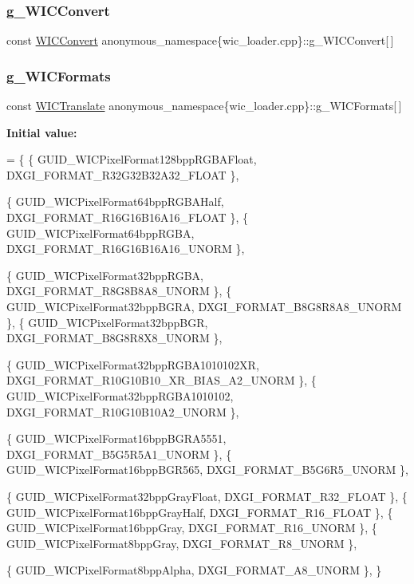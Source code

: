 \subsubsection{\texorpdfstring{g\+\_\+\+W\+I\+C\+Convert}{g\_WICConvert}}
{\footnotesize\ttfamily const \mbox{\hyperlink{structanonymous__namespace_02wic__loader_8cpp_03_1_1_w_i_c_convert}{W\+I\+C\+Convert}} anonymous\+\_\+namespace\{wic\+\_\+loader.\+cpp\}\+::g\+\_\+\+W\+I\+C\+Convert\mbox{[}$\,$\mbox{]}}

\mbox{\label{namespaceanonymous__namespace_02wic__loader_8cpp_03_a210d4a316213824222074b4197e2f55e}} 
\subsubsection{\texorpdfstring{g\+\_\+\+W\+I\+C\+Formats}{g\_WICFormats}}
{\footnotesize\ttfamily const \mbox{\hyperlink{structanonymous__namespace_02wic__loader_8cpp_03_1_1_w_i_c_translate}{W\+I\+C\+Translate}} anonymous\+\_\+namespace\{wic\+\_\+loader.\+cpp\}\+::g\+\_\+\+W\+I\+C\+Formats\mbox{[}$\,$\mbox{]}}

{\bfseries Initial value\+:}
\begin{DoxyCode}
=
    \{
        \{ GUID\_WICPixelFormat128bppRGBAFloat,       DXGI\_FORMAT\_R32G32B32A32\_FLOAT \},

        \{ GUID\_WICPixelFormat64bppRGBAHalf,         DXGI\_FORMAT\_R16G16B16A16\_FLOAT \},
        \{ GUID\_WICPixelFormat64bppRGBA,             DXGI\_FORMAT\_R16G16B16A16\_UNORM \},

        \{ GUID\_WICPixelFormat32bppRGBA,             DXGI\_FORMAT\_R8G8B8A8\_UNORM \},
        \{ GUID\_WICPixelFormat32bppBGRA,             DXGI\_FORMAT\_B8G8R8A8\_UNORM \}, 
        \{ GUID\_WICPixelFormat32bppBGR,              DXGI\_FORMAT\_B8G8R8X8\_UNORM \}, 

        \{ GUID\_WICPixelFormat32bppRGBA1010102XR,    DXGI\_FORMAT\_R10G10B10\_XR\_BIAS\_A2\_UNORM \}, 
        \{ GUID\_WICPixelFormat32bppRGBA1010102,      DXGI\_FORMAT\_R10G10B10A2\_UNORM \},

        \{ GUID\_WICPixelFormat16bppBGRA5551,         DXGI\_FORMAT\_B5G5R5A1\_UNORM \},
        \{ GUID\_WICPixelFormat16bppBGR565,           DXGI\_FORMAT\_B5G6R5\_UNORM \},

        \{ GUID\_WICPixelFormat32bppGrayFloat,        DXGI\_FORMAT\_R32\_FLOAT \},
        \{ GUID\_WICPixelFormat16bppGrayHalf,         DXGI\_FORMAT\_R16\_FLOAT \},
        \{ GUID\_WICPixelFormat16bppGray,             DXGI\_FORMAT\_R16\_UNORM \},
        \{ GUID\_WICPixelFormat8bppGray,              DXGI\_FORMAT\_R8\_UNORM \},

        \{ GUID\_WICPixelFormat8bppAlpha,             DXGI\_FORMAT\_A8\_UNORM \},
    \}
\end{DoxyCode}
